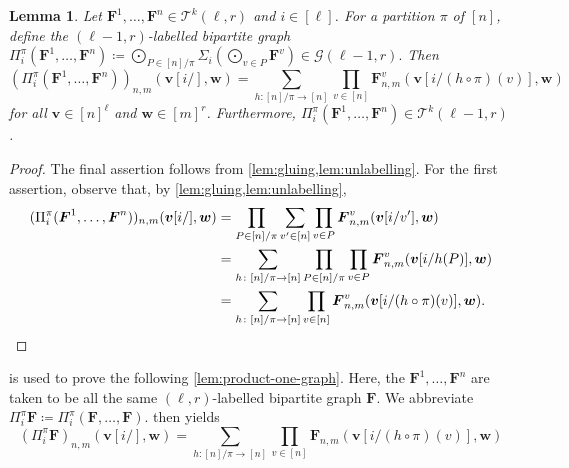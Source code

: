 \documentclass[11pt, DIV=15]{scrarticle}
\theoremstyle{definition}
\theoremstyle{plain}
\newtheorem{lemma}[definition]{Lemma}
\theoremstyle{remark}
\begin{document}
	\begin{lemma}\label{lem:pi-i-pi}
		Let $\boldsymbol{F}^1, \dots, \boldsymbol{F}^n \in \mathcal{T}^k(\ell, r)$ and $i \in [\ell]$.
		For a partition $\pi$ of $[n]$,
		define the $(\ell-1, r)$-labelled bipartite graph
		\(
			\Pi_i^\pi(\boldsymbol{F}^1, \dots, \boldsymbol{F}^n) \coloneqq \bigodot_{P \in [n]/\pi} \Sigma_i(\bigodot_{v \in P} \boldsymbol{F}^v) \in \mathcal{G}(\ell-1, r).
		\)
		Then
		\[
			(\Pi_i^\pi(\boldsymbol{F}^1, \dots, \boldsymbol{F}^n))_{n,m}(\boldsymbol{v}[i/], \boldsymbol{w}) = \sum_{h \colon [n]/\pi \to [n]}  \prod_{v \in [n]} \boldsymbol{F}^v_{n, m}(\boldsymbol{v}[i/(h\circ \pi)(v)], \boldsymbol{w})
		\]
		for all $\boldsymbol{v} \in [n]^\ell$ and $\boldsymbol{w} \in [m]^r$.
		Furthermore, $\Pi_i^\pi(\boldsymbol{F}^1, \dots, \boldsymbol{F}^n) \in \mathcal{T}^k(\ell-1, r) $. 
	\end{lemma}
	\begin{proof}
		The final assertion follows from \cref{lem:gluing,lem:unlabelling}.
		For the first assertion, observe that, by \cref{lem:gluing,lem:unlabelling},
		\begin{align*}
			(\Pi_i^\pi(\boldsymbol{F}^1, \dots, \boldsymbol{F}^n))_{n,m}(\boldsymbol{v}[i/], \boldsymbol{w})
			&= \prod_{P \in [n]/\pi} \sum_{v' \in [n]} \prod_{v \in P} \boldsymbol{F}^v_{n,m}(\boldsymbol{v}[i/v'], \boldsymbol{w}) \\
			&= \sum_{h \colon [n]/\pi \to [n]}  \prod_{P \in [n]/\pi} \prod_{v \in P} \boldsymbol{F}^v_{n,m}(\boldsymbol{v}[i/h(P)], \boldsymbol{w}) \\
			&= \sum_{h \colon [n]/\pi \to [n]}  \prod_{v \in [n]} \boldsymbol{F}_{n, m}^v(\boldsymbol{v}[i/(h\circ \pi)(v)], \boldsymbol{w}). \qedhere
		\end{align*}
	\end{proof}
	
	 is used to prove the following \cref{lem:product-one-graph}.
	Here,  the $\boldsymbol{F}^1, \dots, \boldsymbol{F}^n$ are taken to be all the same $(\ell, r)$-labelled bipartite graph $\boldsymbol{F}$.
	We abbreviate $\Pi_i^\pi \boldsymbol{F} \coloneqq \Pi_i^\pi(\boldsymbol{F}, \dots, \boldsymbol{F})$.
	 then yields
	\begin{equation}\label{eq:pi-i-pi-simplified}
		(\Pi_i^\pi \boldsymbol{F})_{n,m}(\boldsymbol{v}[i/], \boldsymbol{w}) = \sum_{h \colon [n]/\pi \to [n]}  \prod_{v \in [n]} \boldsymbol{F}_{n, m}(\boldsymbol{v}[i/(h\circ \pi)(v)], \boldsymbol{w})
	\end{equation}
	
\end{document}
